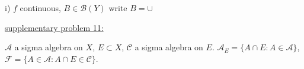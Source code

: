 \documentclass[12pt]{article}
\begin{document}
\begin{flushleft}
i) $f$ continuous, $B \in \mathcal{B}(Y) $ write $B = \cup $
\end{flushleft}








\begin{flushleft}
\underline{supplementary problem 11:}
\end{flushleft}

\begin{flushleft}
$\mathcal{A}$ a sigma algebra on $X$, $E \subset X$, $\mathcal{C}$ a sigma algebra on $E$. $\mathcal{A}_E = \{ A \cap E: A \in \mathcal{A} \} $, $\mathcal{F} = \{ A \in \mathcal{A}: A \cap E \in \mathcal{C} \}$. 
\end{flushleft}
\end{document}
